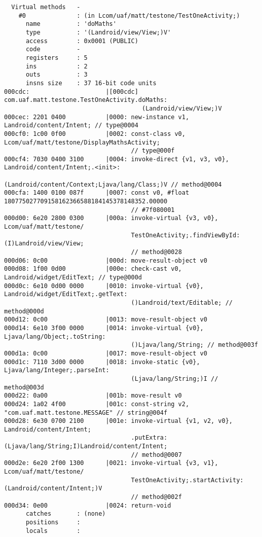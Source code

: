 \begin{lstlisting}
  Virtual methods   -
    #0              : (in Lcom/uaf/matt/testone/TestOneActivity;)
      name          : 'doMaths'
      type          : '(Landroid/view/View;)V'
      access        : 0x0001 (PUBLIC)
      code          -
      registers     : 5
      ins           : 2
      outs          : 3
      insns size    : 37 16-bit code units
000cdc:                     |[000cdc] com.uaf.matt.testone.TestOneActivity.doMaths:
                                      (Landroid/view/View;)V
000cec: 2201 0400           |0000: new-instance v1, Landroid/content/Intent; // type@0004
000cf0: 1c00 0f00           |0002: const-class v0, Lcom/uaf/matt/testone/DisplayMathsActivity;
                                   // type@000f
000cf4: 7030 0400 3100      |0004: invoke-direct {v1, v3, v0}, Landroid/content/Intent;.<init>:
                                   (Landroid/content/Context;Ljava/lang/Class;)V // method@0004
000cfa: 1400 0100 087f      |0007: const v0, #float 180775027709158162366588184145378148352.00000
                                   // #7f080001
000d00: 6e20 2800 0300      |000a: invoke-virtual {v3, v0}, Lcom/uaf/matt/testone/
                                   TestOneActivity;.findViewById:(I)Landroid/view/View;
                                   // method@0028
000d06: 0c00                |000d: move-result-object v0
000d08: 1f00 0d00           |000e: check-cast v0, Landroid/widget/EditText; // type@000d
000d0c: 6e10 0d00 0000      |0010: invoke-virtual {v0}, Landroid/widget/EditText;.getText:
                                   ()Landroid/text/Editable; // method@000d
000d12: 0c00                |0013: move-result-object v0
000d14: 6e10 3f00 0000      |0014: invoke-virtual {v0}, Ljava/lang/Object;.toString:
                                   ()Ljava/lang/String; // method@003f
000d1a: 0c00                |0017: move-result-object v0
000d1c: 7110 3d00 0000      |0018: invoke-static {v0}, Ljava/lang/Integer;.parseInt:
                                   (Ljava/lang/String;)I // method@003d
000d22: 0a00                |001b: move-result v0
000d24: 1a02 4f00           |001c: const-string v2, "com.uaf.matt.testone.MESSAGE" // string@004f
000d28: 6e30 0700 2100      |001e: invoke-virtual {v1, v2, v0}, Landroid/content/Intent;
                                   .putExtra:(Ljava/lang/String;I)Landroid/content/Intent;
                                   // method@0007
000d2e: 6e20 2f00 1300      |0021: invoke-virtual {v3, v1}, Lcom/uaf/matt/testone/
                                   TestOneActivity;.startActivity:(Landroid/content/Intent;)V
                                   // method@002f
000d34: 0e00                |0024: return-void
      catches       : (none)
      positions     :
      locals        :


\end{lstlisting}
